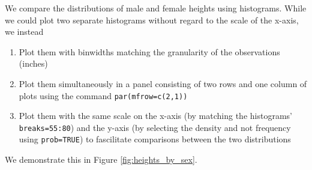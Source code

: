 \documentclass{article}\usepackage[]{graphicx}\usepackage[]{color}
\begin{document}
We compare the distributions of male and female heights using histograms.  While we could plot two separate histograms without regard to the scale of the x-axis, we instead

\begin{enumerate}
\item Plot them with binwidths matching the granularity of the observations (inches)
\item Plot them simultaneously in a panel consisting of two rows and one column of plots using the command \verb#par(mfrow=c(2,1))#
\item Plot them with the same scale on the x-axis (by matching the histograms' \verb#breaks=55:80#) and the y-axis (by selecting the density and not frequency using \verb#prob=TRUE#) to fascilitate comparisons between the two distributions
\end{enumerate}

We demonstrate this in Figure \ref{fig:heights_by_sex}.
\end{document}
